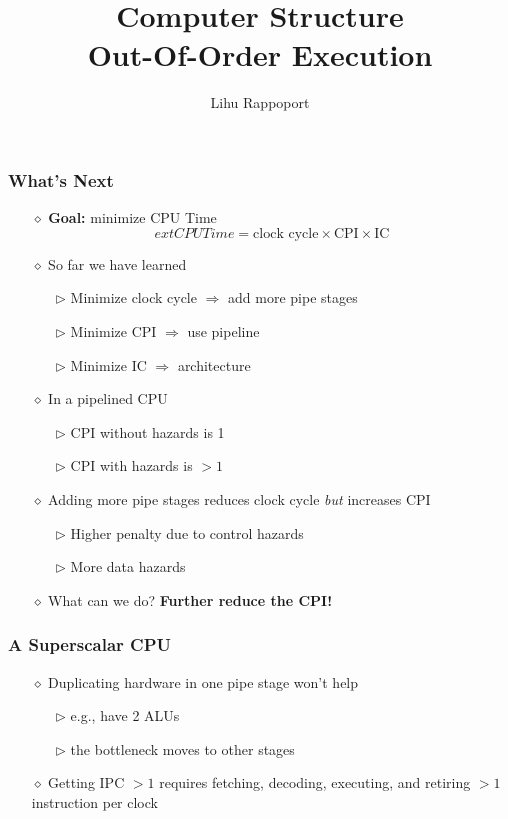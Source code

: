 \documentclass[aspectratio=169]{beamer}
\title{Computer Structure\\\large Out-Of-Order Execution}
\author{Lihu Rappoport}
\institute{Technion -- Computer Science}
\date{}
\begin{document}
\begin{frame}
  \titlepage
\end{frame}

\begin{frame}
\frametitle{What's Next}
\begin{itemize}
  \item[$\diamond$] \textbf{Goal:} minimize CPU Time
  \begin{equation*}
    	ext{CPU Time} = \text{clock cycle} \times \text{CPI} \times \text{IC}
  \end{equation*}
  \item[$\diamond$] So far we have learned
  \begin{itemize}
    \item[$\triangleright$] Minimize clock cycle $\Rightarrow$ add more pipe stages
    \item[$\triangleright$] Minimize CPI $\Rightarrow$ use pipeline
    \item[$\triangleright$] Minimize IC $\Rightarrow$ architecture
  \end{itemize}
  \item[$\diamond$] In a pipelined CPU
  \begin{itemize}
    \item[$\triangleright$] CPI without hazards is 1
    \item[$\triangleright$] CPI with hazards is $> 1$
  \end{itemize}
  \item[$\diamond$] Adding more pipe stages reduces clock cycle \emph{but} increases CPI
  \begin{itemize}
    \item[$\triangleright$] Higher penalty due to control hazards
    \item[$\triangleright$] More data hazards
  \end{itemize}
  \item[$\diamond$] What can we do? \textbf{Further reduce the CPI!}
\end{itemize}
\end{frame}

\begin{frame}
\frametitle{A Superscalar CPU}
\begin{itemize}
  \item[$\diamond$] Duplicating hardware in one pipe stage won’t help
  \begin{itemize}
    \item[$\triangleright$] e.g., have 2 ALUs
    \item[$\triangleright$] the bottleneck moves to other stages
  \end{itemize}
  \item[$\diamond$] Getting IPC $>1$ requires fetching, decoding, executing, and retiring $>1$ instruction per clock
\end{itemize}
\end{frame}
\end{document}
